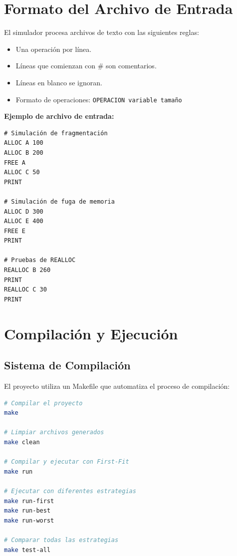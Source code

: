 \documentclass[12pt,a4paper]{article}
\begin{document}
\section{Formato del Archivo de Entrada}

El simulador procesa archivos de texto con las siguientes reglas:

\begin{itemize}
    \item Una operación por línea.
    \item Líneas que comienzan con \# son comentarios.
    \item Líneas en blanco se ignoran.
    \item Formato de operaciones: \texttt{OPERACION variable tamaño}
\end{itemize}

\textbf{Ejemplo de archivo de entrada:}

\begin{lstlisting}
# Simulación de fragmentación
ALLOC A 100
ALLOC B 200
FREE A
ALLOC C 50
PRINT

# Simulación de fuga de memoria
ALLOC D 300
ALLOC E 400
FREE E
PRINT

# Pruebas de REALLOC
REALLOC B 260
PRINT
REALLOC C 30
PRINT
\end{lstlisting}

\section{Compilación y Ejecución}

\subsection{Sistema de Compilación}

El proyecto utiliza un Makefile que automatiza el proceso de compilación:

\begin{lstlisting}[language=bash]
# Compilar el proyecto
make

# Limpiar archivos generados
make clean

# Compilar y ejecutar con First-Fit
make run

# Ejecutar con diferentes estrategias
make run-first
make run-best
make run-worst

# Comparar todas las estrategias
make test-all
\end{lstlisting}
\end{document}
